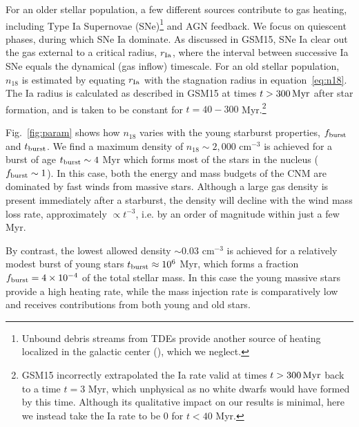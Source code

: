 \documentclass[usenatbib,fleqn]{mnras}
\begin{document}
For an older stellar population, a few different sources contribute to
gas heating, including Type Ia Supernovae (SNe)\footnote{Unbound
  debris streams from TDEs provide another source of heating localized
  in the galactic center (\citealt{Guillochon+2015a}), which we
  neglect.} and AGN feedback.  We focus on quiescent phases, during
which SNe Ia dominate.  As discussed in GSM15, SNe Ia clear out the
gas external to a critical radius, $r_{\rm Ia}$, where the interval
between successive Ia SNe equals the dynamical (gas inflow) timescale.
For an old stellar population, $n_{18}$ is estimated by equating
$r_{\rm Ia}$ with the stagnation radius in equation~\eqref{eq:n18}.
The Ia radius is calculated as described in GSM15 at times $t>300
\,{\rm Myr}$ after star formation, and is taken to be constant for $t
= 40-300$ Myr.\footnote{GSM15 incorrectly extrapolated the Ia rate
  valid at times $t>300 \,{\rm Myr}$ back to a time $t = 3$ Myr, which
  unphysical as no white dwarfs would have formed by this time.
  Although its qualitative impact on our results is minimal, here we
  instead take the Ia rate to be 0 for $ t < 40$ Myr.}


Fig.~\ref{fig:param} shows how $n_{18}$ varies with the young
starburst properties, $f_{\rm burst}$ and $t_{\rm burst}$.  We find a
maximum density of $n_{18} \sim 2,000$ cm$^{-3}$ is achieved for a
burst of age $t_{\rm burst} \sim 4$ Myr which forms most of the stars
in the nucleus ($f_{\rm burst} \sim 1$).  In this case, both the
energy and mass budgets of the CNM are dominated by fast winds from
massive stars.  Although a large gas density is present immediately
after a starburst, the density will decline with the wind mass loss
rate, approximately $\propto t^{-3}$, i.e. by an order of magnitude
within just a few Myr.

By contrast, the lowest allowed density $\sim 0.03$ cm$^{-3}$ is
achieved for a relatively modest burst of young stars $t_{\rm burst}
\approx 10^{6}$ Myr, which forms a fraction $f_{\rm burst} = 4\times
10^{-4}$ of the total stellar mass. In this case the young massive
stars provide a high heating rate, while the mass injection rate is
comparatively low and receives contributions from both young and old
stars.
\end{document}
